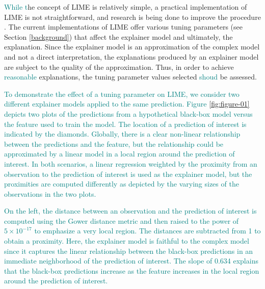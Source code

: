 \documentclass[AMS,STIX2COL]{WileyNJD-v2}\usepackage[]{graphicx}\usepackage[]{color}
\newcommand{\kge}[1]{\textcolor{teal}{#1}}
\renewcommand{\sout}[1]{\unskip}
\begin{document}
\kge{While t}\sout{T}he concept of LIME is relatively simple\sout{: use an interpretable model to approximate a complex model in a local region. However}, a practical implementation of LIME is not straightforward, and research is being done to improve the procedure \citep{laugel:2018}. The current implementations of LIME \citep{pedersen:2020} \citep{ribeiro:2020} offer various tuning parameters (see Section \ref{background}) that affect the explainer model and ultimately, the explanation. Since the explainer model is an approximation of the complex model and not a direct interpretation, the explanations produced by an explainer model are subject to the quality of the approximation. Thus, in order to achieve \kge{reasonable} \sout{accurate} explanations, the tuning parameter values selected \kge{shoud} \sout{need to} be assessed.

\kge{To demonstrate the effect of a tuning parameter on LIME, we consider two different explainer models applied to the same prediction. Figure \ref{fig:figure-01} depicts two plots of the predictions from a hypothetical black-box model versus the feature used to train the model. The location of a prediction of interest is indicated by the diamonds. Globally, there is a clear non-linear relationship between the predictions and the feature, but the relationship could be approximated by a linear model in a local region around the prediction of interest. In both scenarios, a linear regression weighted by the proximity from an observation to the prediction of interest is used as the explainer model, but the proximities are computed differently as depicted by the varying sizes of the observations in the two plots.} 

\kge{On the left, the distance between an observation and the prediction of interest is computed using the Gower distance metric \citep{gower:1971} and then raised to the power of \ensuremath{5\times 10^{-17}} to emphasize a very local region. The distances are subtracted from 1 to obtain a proximity. Here, the explainer model is faithful to the complex model since it captures the linear relationship between the black-box predictions in an immediate neighborhood of the prediction of interest. The slope of 0.634 explains that the black-box predictions increase as the feature increases in the local region around the prediction of interest.}
\end{document}
